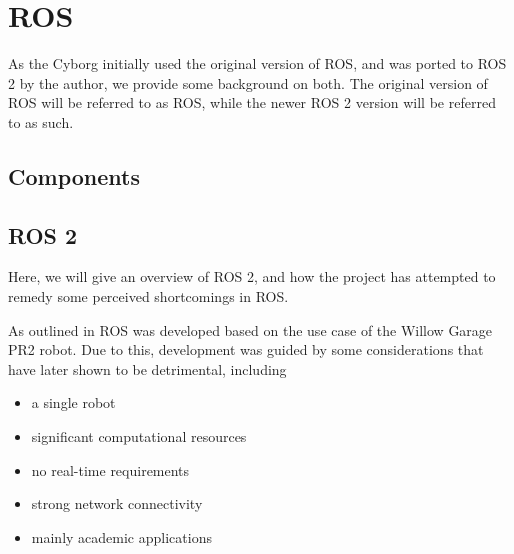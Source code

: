 \documentclass[\rootfolder/main.tex]{subfiles}
\begin{document}




\label{ch:matmet} %

\section{ROS}

As the Cyborg initially used the original version of ROS, and was ported to ROS 2 by the author, we provide some background on both.
The original version of ROS will be referred to as ROS, while the newer ROS 2 version will be referred to as such.

\subsection{Components}

\subsection{ROS 2}

Here, we will give an overview of ROS 2, and how the project has attempted to remedy some perceived shortcomings in ROS.

As outlined in \cite{Gerkey2017} ROS was developed based on the use case of the Willow Garage PR2 robot.
Due to this, development was guided by some considerations that have later shown to be detrimental, including

\begin{itemize}
    \item a single robot
    \item significant computational resources
    \item no real-time requirements
    \item strong network connectivity
    \item mainly academic applications
\end{itemize}
\end{document}
